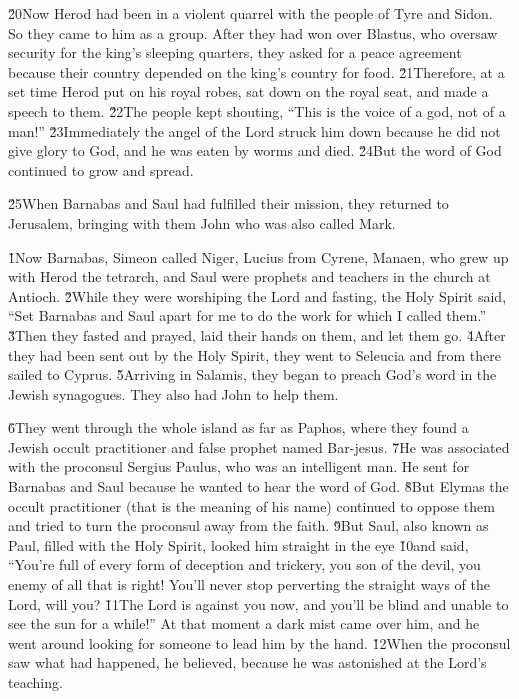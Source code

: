 \v{20}Now Herod had been in a violent quarrel with the people of Tyre and Sidon. So they came to him as a group. After they had won over Blastus, who oversaw security for the king's sleeping quarters, they asked for a peace agreement because their country depended on the king's country for food. \v{21}Therefore, at a set time Herod put on his royal robes, sat down on the royal seat, and made a speech to them. \v{22}The people kept shouting, ``This is the voice of a god, not of a man!'' \v{23}Immediately the angel of the Lord struck him down because he did not give glory to God, and he was eaten by worms and died. \v{24}But the word of God continued to grow and spread.

\v{25}When Barnabas and Saul had fulfilled their mission, they returned to Jerusalem, bringing with them John who was also called Mark.

\v{1}Now Barnabas, Simeon called Niger, Lucius from Cyrene, Manaen, who grew up with Herod the tetrarch, and Saul were prophets and teachers in the church at Antioch. \v{2}While they were worshiping the Lord and fasting, the Holy Spirit said, ``Set Barnabas and Saul apart for me to do the work for which I called them.'' \v{3}Then they fasted and prayed, laid their hands on them, and let them go. \v{4}After they had been sent out by the Holy Spirit, they went to Seleucia and from there sailed to Cyprus. \v{5}Arriving in Salamis, they began to preach God's word in the Jewish synagogues. They also had John to help them.

\v{6}They went through the whole island as far as Paphos, where they found a Jewish occult practitioner and false prophet named Bar-jesus. \v{7}He was associated with the proconsul Sergius Paulus, who was an intelligent man. He sent for Barnabas and Saul because he wanted to hear the word of God. \v{8}But Elymas the occult practitioner (that is the meaning of his name) continued to oppose them and tried to turn the proconsul away from the faith. \v{9}But Saul, also known as Paul, filled with the Holy Spirit, looked him straight in the eye \v{10}and said, ``You're full of every form of deception and trickery, you son of the devil, you enemy of all that is right! You'll never stop perverting the straight ways of the Lord, will you? \v{11}The Lord is against you now, and you'll be blind and unable to see the sun for a while!'' At that moment a dark mist came over him, and he went around looking for someone to lead him by the hand. \v{12}When the proconsul saw what had happened, he believed, because he was astonished at the Lord's teaching.

